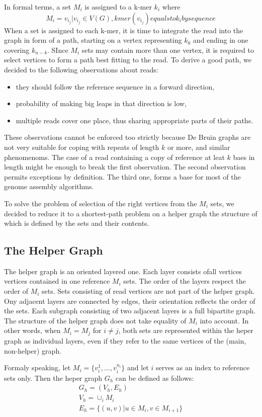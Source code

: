 In formal terms, a set $M_i$ is assigned to a k-mer $k_i$ where
$$
M_i = {v_{i_j} | v_{i_j} \in V(G), kmer(v_{i_j}) equals to k_i by sequence}
$$ 
When a set is assigned to each k-mer, it is time to integrate the read into the graph in form of a path, starting on a vertex representing $k_0$ and ending in one covering $k_{n-k}$. SInce $M_i$ sets may contain more than one vertex, it is required to select vertices to form a path best fitting to the read. To derive a good path, we decided to the following observations about reads:
\begin{itemize}
\item they should follow the reference sequence in a forward direction,
\item probability of making big leaps in that direction is low,
\item multiple reads cover one place, thus sharing appropriate parts of their paths.
\end{itemize}

These observations cannot be enforced too strictly because De Bruin graphs are not very suitable for coping with repeats of length $k$ or more, and similar phenomenoms. The case of a read containing a copy of reference at leat $k$ baes in length might be enough to break the first observation. The second observation permits exceptions by definition. The third one, forms a base for most of the genome assembly algorithms.

To solve the problem of selection of the right vertices from the $M_i$ sets, we decided to reduce it to a shortest-path problem on a helper graph the structure of which is defined by the sets and their contents.

\subsection{The Helper Graph}
\label{subsec:helper-graph}

The helper graph is an oriented layered one. Each layer consists ofall vertices  vertices contained in one reference $M_i$ sets. The order of the layers respect the order of $M_i$ sets. Sets consisting of read vertices are not part of the helper graph. Ony adjacent layers are connected by edges, their orientation reflects the order of the sets. Each subgraph consisting of two adjacent layers is a full bipartite graph. The structure of the helper graph does not take equality of $M_i$ into account. In other words, when $M_i = M_j$ for $i \ne j$, both sets are represented within the heper graph as individual layers, even if they refer to the same vertices of the (main, non-helper) graph.

Formaly speaking, let $M_i = \{v_{i}^{1}, ..., v_{i}^{n_i}\}$ and let $i$ serves as an index to reference sets only. Then the heper graph $G_h$ can be defined as follows:
\begin{gather}
G_h = (V_h, E_h) \\
V_h = \cup_i M_i \\
E_h = \{(u, v) | u \in M_i, v \in M_{i + 1}\}
\end{gather}

